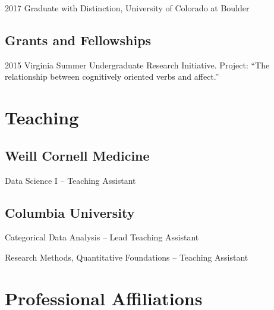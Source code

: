 \documentclass[12pt,letterpaper]{report}
\newcommand{\listitemspace}{0.15em}
\renewenvironment{itemize}
{\begin{list}{}{\setlength{\leftmargin}{0em}
            \setlength{\parskip}{0em}
            \setlength{\itemsep}{\listitemspace}
            \setlength{\parsep}{\listitemspace}}}
    {\end{list}}
\begin{document}
    \begin{tablist}

        \item[2017] \tab Graduate with Distinction, University of Colorado at Boulder

    \end{tablist}

    \subsection*{Grants and Fellowships}

    \begin{tablist}

        \item[2015] \tab Virginia Summer Undergraduate Research Initiative. Project: \enquote{The relationship between cognitively oriented verbs and affect.}

    \end{tablist}

    \section*{Teaching}
    
    \subsection*{Weill Cornell Medicine}
    
    \begin{itemize}
    
    	\item Data Science I -- Teaching Assistant
    
    \end{itemize}

    \subsection*{Columbia University}
    
    \begin{itemize}
    	
    	\item Categorical Data Analysis -- Lead Teaching Assistant
    	\item Research Methods, Quantitative Foundations -- Teaching Assistant
    
    \end{itemize}

    \section*{Professional Affiliations}
\end{document}
